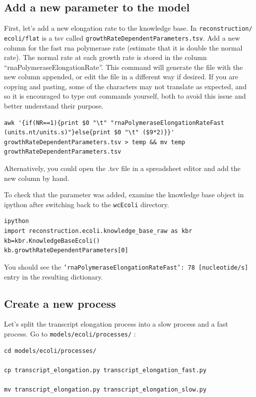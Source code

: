 \documentclass[12pt]{article}
\begin{document}
\subsection{Add a new parameter to the model}

First, let's add a new elongation rate to the knowledge base. In \texttt{reconstruction/ \allowbreak ecoli/flat} is a tsv called \texttt{growthRateDependentParameters.tsv}. Add a new column for the fast rna polymerase rate (estimate that it is double the normal rate). The normal rate at each growth rate is stored in the column ``rnaPolymeraseElongationRate''. This command will generate the file with the new column appended, or edit the file in a different way if desired. If you are copying and pasting, some of the characters may not translate as expected, and so it is encouraged to type out commands yourself, both to avoid this issue and better understand their purpose.

\begin{lstlisting}
awk '{if(NR==1){print $0 "\t" "rnaPolymeraseElongationRateFast (units.nt/units.s)"}else{print $0 "\t" ($9*2)}}' growthRateDependentParameters.tsv > temp && mv temp growthRateDependentParameters.tsv  
\end{lstlisting}

Alternatively, you could open the .tsv file in a spreadsheet editor and add the new column by hand.

To check that the parameter was added, examine the knowledge base object in ipython after switching back to the \texttt{wcEcoli} directory.

\lstset{language=Python}
\begin{lstlisting}
ipython
import reconstruction.ecoli.knowledge_base_raw as kbr
kb=kbr.KnowledgeBaseEcoli()
kb.growthRateDependentParameters[0]
\end{lstlisting}

You should see the \texttt{'rnaPolymeraseElongationRateFast': 78 [nucleotide/s]} entry in the resulting dictionary.

\subsection{Create a new process}

Let's split the transcript elongation process into a slow process and a fast process. Go to \texttt{models/ecoli/processes/} :

\lstset{language=bash}
\begin{lstlisting}
cd models/ecoli/processes/

cp transcript_elongation.py transcript_elongation_fast.py

mv transcript_elongation.py transcript_elongation_slow.py
\end{lstlisting}
\end{document}
